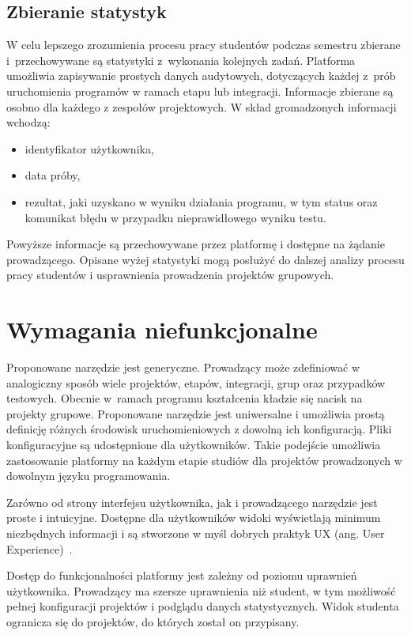 \subsection{Zbieranie statystyk}

W celu lepszego zrozumienia procesu pracy studentów podczas semestru zbierane i~przechowywane są statystyki z~wykonania kolejnych zadań.
Platforma umożliwia zapisywanie prostych danych audytowych, dotyczących każdej z~prób uruchomienia programów w ramach etapu lub integracji.
Informacje zbierane są osobno dla każdego z zespołów projektowych.
W skład gromadzonych informacji wchodzą:
\begin{itemize}
    \item identyfikator użytkownika,
    \item data próby,
    \item rezultat, jaki uzyskano w wyniku działania programu, w tym status oraz komunikat błędu w przypadku nieprawidłowego wyniku testu.
\end{itemize}
Powyższe informacje są przechowywane przez platformę i dostępne na żądanie prowadzącego.
Opisane wyżej statystyki mogą posłużyć do dalszej analizy procesu pracy studentów i usprawnienia prowadzenia projektów grupowych.


\section{Wymagania niefunkcjonalne}

Proponowane narzędzie jest generyczne.
Prowadzący może zdefiniować w analogiczny sposób wiele projektów, etapów, integracji, grup oraz przypadków testowych.
Obecnie w~ramach programu kształcenia kładzie się nacisk na projekty grupowe.
Proponowane narzędzie jest uniwersalne i umożliwia prostą definicję różnych środowisk uruchomieniowych z dowolną ich konfiguracją.
Pliki konfiguracyjne są udostępnione dla użytkowników.
Takie podejście umożliwia zastosowanie platformy na każdym etapie studiów dla projektów prowadzonych w dowolnym języku programowania.

Zarówno od strony interfejsu użytkownika, jak i prowadzącego narzędzie jest proste i intuicyjne.
Dostępne dla użytkowników widoki wyświetlają minimum niezbędnych informacji i są stworzone w myśl dobrych praktyk UX (ang. User Experience)~\cite{ux-good-practicies}.

Dostęp do funkcjonalności platformy jest zależny od poziomu uprawnień użytkownika.
Prowadzący ma szersze uprawnienia niż student, w tym możliwość pełnej konfiguracji projektów i podglądu danych statystycznych.
Widok studenta ogranicza się do projektów, do których został on przypisany.

